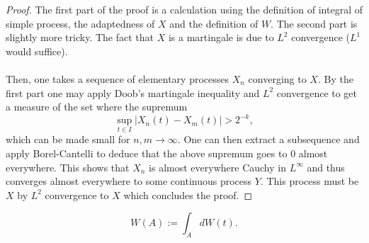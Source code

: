 \documentclass[12pt]{article}
\begin{document}
\begin{proof}
	The first part of the proof is a calculation using the definition of integral of simple process, the adaptedness of $X$ and the definition of  $W$. The second part is slightly more tricky. The fact that $X$ is a martingale is due to  $L^2$ convergence ($L^1$ would suffice).\\\\ Then, one takes a sequence of elementary processes  $X_n$ converging to  $X$. By the first part one may apply Doob's martingale inequality and $L^2$ convergence to get a measure of the set where the supremum
	\begin{equation*}
		\sup_{t\in I}  |X_n(t)-X_m(t)|>2^{-k},
	\end{equation*}
	which can be made small for $n,m \to\infty$. One can then extract a subsequence and apply Borel-Cantelli to deduce that the above supremum goes to $0$ almost everywhere. This shows that  $X_n$ is almost everywhere Cauchy in  $L^\infty$ and thus converges almost everywhere to some continuous process $Y$. This process must be $X$ by  $L^2$ convergence to  $X$ which concludes the proof.

\end{proof}



\begin{equation*}
	W(A):=\int_{A} dW(t).
\end{equation*}
\end{document}
